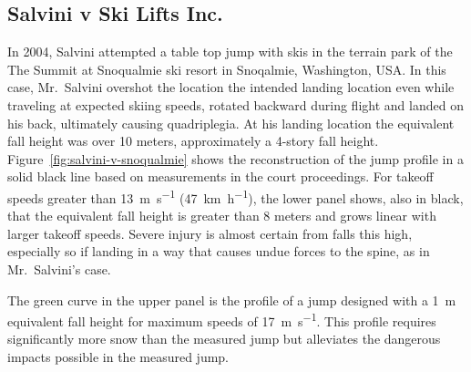 \documentclass{article}
\begin{document}
\subsection{Salvini v Ski Lifts Inc.}
%
In 2004, Salvini attempted a table top jump with skis in the terrain
park of the The Summit at Snoqualmie ski resort in Snoqalmie, Washington, USA.
In this case, Mr.~Salvini overshot the location the intended
landing location even while traveling at expected skiing speeds, rotated 
backward during flight and landed on his back, ultimately causing
quadriplegia. At his landing location the equivalent fall height was over 10
meters, approximately a 4-story fall height.
Figure~\ref{fig:salvini-v-snoqualmie} shows the reconstruction of the jump
profile in a solid black line based on measurements in the court proceedings.
For takeoff speeds greater than 13~\si{\meter\per\second}
(47~\si{\kilo\meter\per\hour}), the lower panel shows, also in black, that the
equivalent fall height is greater than 8 meters and grows linear with larger
takeoff speeds. Severe injury is almost certain from falls this high,
especially so if landing in a way that causes undue forces to the spine, as in
Mr.~Salvini's case.

The green curve in the upper panel is the profile of a jump designed with a
1~\si{\meter} equivalent fall height for maximum speeds of
17~\si{\meter\per\second}. This profile requires significantly more snow than
the measured jump but alleviates the dangerous impacts possible in the measured
jump.
\end{document}
